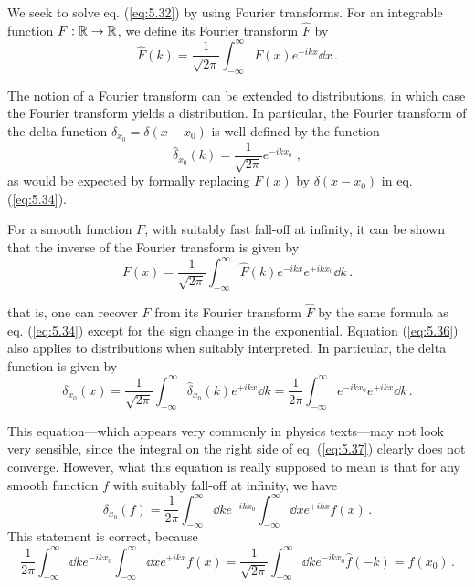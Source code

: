 We seek to solve eq.  (\ref{eq:5.32}) by using Fourier transforms. For an integrable function $F : \mathbb{R} \rightarrow \mathbb{R}$, we define its Fourier transform $\hat{F}$ by 
\begin{equation}\label{eq:5.34}
\hat{F}(k) = \frac{1}{\sqrt{2\pi}} \int_{- \infty}^{\infty} F(x) e^{-ikx}\dd{x}\,.
\end{equation}

The notion of a Fourier transform can be extended to distributions, in which case the Fourier transform yields a distribution. In particular, the Fourier transform of the delta function $\delta_{x_0} = \delta(x - x_0)$ is well defined by the function
\begin{equation}\label{eq:5.35}
\hat{\delta}_{x_0}(k) = \frac{1}{\sqrt{2\pi}} e^{-ik x_0}\;,
\end{equation}
as would be expected by formally replacing $F(x)$ by $\delta(x - x_0)$ in eq. (\ref{eq:5.34}). 

For a smooth function $F$, with suitably fast fall-off at infinity, it can be shown that the inverse of the Fourier transform is given by
\begin{equation}\label{eq:5.36}
F(x) = \frac{1}{\sqrt{2\pi}} \int_{- \infty}^{\infty} \hat{F}(k) e^{-ikx} e^{+ikx_0}\dd{k}\,.
\end{equation}

that is, one can recover $F$ from its Fourier transform $\hat{F}$ by the same formula as eq. (\ref{eq:5.34}) except for the sign change in the exponential. Equation (\ref{eq:5.36}) also applies to distributions when suitably interpreted. In particular, the delta function is given by 
\begin{equation}\label{eq:5.37}
\delta_{x_0}(x) = \frac{1}{\sqrt{2\pi}} \int_{-\infty}^{\infty} \hat{\delta}_{x_0}(k) e^{+ikx}\dd{k} =  
\frac{1}{2\pi} \int_{-\infty}^{\infty} e^{-ikx_0} e^{+ikx} \dd{k}\,.
\end{equation}

This equation---which appears very commonly in physics texts---may not look very sensible, since the integral on the right side of eq. (\ref{eq:5.37}) clearly does not converge. However, what this equation is really supposed to mean is that for any smooth function $f$ with suitably fall-off at infinity, we have
\begin{equation}\label{eq:5.38}
\delta_{x_0}(f) = \frac{1}{2 \pi} \int_{-\infty}^{\infty} \dd{k} e^{-ikx_0} \int_{-\infty}^{\infty} \dd{x} e^{+ikx} f(x)\,.
\end{equation}
This statement is correct, because 
\begin{equation}\label{eq:5.39}
\frac{1}{2 \pi} \int_{-\infty}^{\infty} \dd{k} e^{-ikx_0} \int_{-\infty}^{\infty} \dd{x} e^{+ikx} f(x) = 
\frac{1}{\sqrt{2\pi}} \int_{-\infty}^{\infty} \dd{k} e^{-ikx_0} \hat{f}(-k) = f(x_0)\,.
\end{equation}

